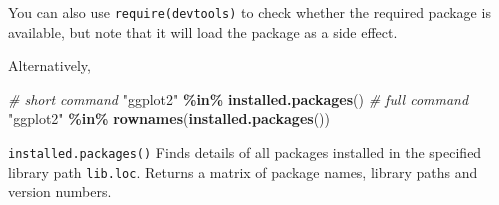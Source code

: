 \documentclass[
  a4paper,
  twoside,
  openright]{book}
\newenvironment{Shaded}{\begin{snugshade}}{\end{snugshade}}
\newcommand{\CommentTok}[1]{\textcolor[rgb]{0.56,0.35,0.01}{\textit{#1}}}
\newcommand{\DecValTok}[1]{\textcolor[rgb]{0.00,0.00,0.81}{#1}}
\newcommand{\ErrorTok}[1]{\textcolor[rgb]{0.64,0.00,0.00}{\textbf{#1}}}
\newcommand{\FunctionTok}[1]{\textcolor[rgb]{0.13,0.29,0.53}{\textbf{#1}}}
\newcommand{\NormalTok}[1]{#1}
\newcommand{\OtherTok}[1]{\textcolor[rgb]{0.56,0.35,0.01}{#1}}
\newcommand{\SpecialCharTok}[1]{\textcolor[rgb]{0.81,0.36,0.00}{\textbf{#1}}}
\newcommand{\StringTok}[1]{\textcolor[rgb]{0.31,0.60,0.02}{#1}}
\theoremstyle{definition}
\theoremstyle{definition}
\theoremstyle{definition}
\theoremstyle{definition}
\theoremstyle{remark}
\begin{document}
You can also use \texttt{require(devtools)} to check whether the required package is available, but note that it will load the package as a side effect.

Alternatively,

\begin{Shaded}
\begin{Highlighting}[]
\CommentTok{\# short command}
\StringTok{"ggplot2"} \SpecialCharTok{\%in\%} \FunctionTok{installed.packages}\NormalTok{()}
\CommentTok{\# full command}
\StringTok{"ggplot2"} \SpecialCharTok{\%in\%} \FunctionTok{rownames}\NormalTok{(}\FunctionTok{installed.packages}\NormalTok{())}
\end{Highlighting}
\end{Shaded}

\texttt{installed.packages()} Finds details of all packages installed in the specified library path \texttt{lib.loc}. Returns a matrix of package names, library paths and version numbers.

\begin{Shaded}
\end{Shaded}
\end{document}
